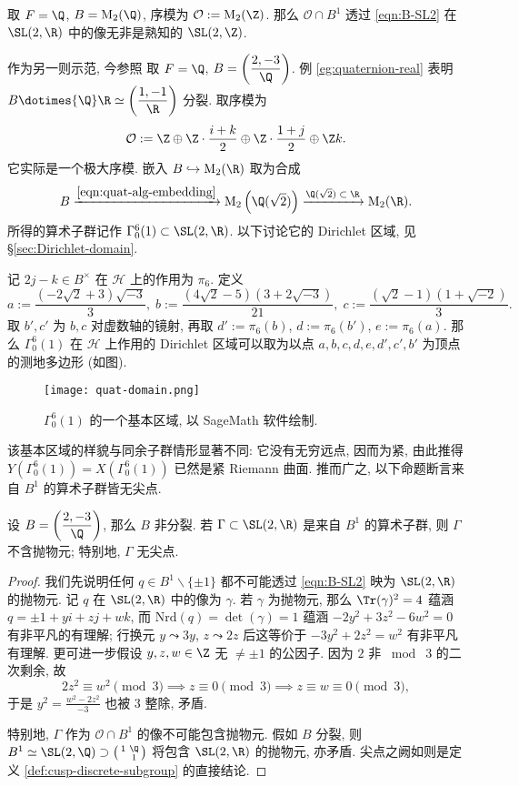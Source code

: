 \begin{example}
	取 $F = \Q$, $B = \Mat_2(\Q)$, 序模为 $\mathcal{O} := \Mat_2(\Z)$. 那么 $\mathcal{O} \cap B^1$ 透过 \eqref{eqn:B-SL2} 在 $\SL(2,\R)$ 中的像无非是熟知的 $\SL(2,\Z)$.
\end{example}

作为另一则示范, 今参照 \cite[\S 5]{KV03} 取 $F=\Q$, $B = \left( \dfrac{2, -3}{\Q} \right)$. 例 \ref{eg:quaternion-real} 表明 $B \dotimes{\Q} \R \simeq \left( \dfrac{1, -1}{\R} \right)$ 分裂. 取序模为
\[ \mathcal{O} := \Z \oplus \Z\cdot \dfrac{i + k}{2} \oplus \Z\cdot \dfrac{1 + j}{2} \oplus \Z k. \]
它实际是一个极大序模. 嵌入 $B \hookrightarrow \Mat_2(\R)$ 取为合成
\[ B \xrightarrow{\eqref{eqn:quat-alg-embedding}} \Mat_2\left(\Q(\sqrt{2})\right) \xrightarrow{\Q(\sqrt{2}) \; \subset \; \R} \Mat_2(\R). \]
所得的算术子群记作 $\Gamma^6_0(1) \subset \SL(2,\R)$. 以下讨论它的 Dirichlet 区域, 见 \S\ref{sec:Dirichlet-domain}.

记 $2j-k \in B^\times$ 在 $\mathcal{H}$ 上的作用为 $\pi_6$. 定义
\[ a := \dfrac{(-2\sqrt{2} + 3)\sqrt{-3}}{3},\; b := \dfrac{(4\sqrt{2}-5)(3 + 2\sqrt{-3})}{21},\; c := \dfrac{(\sqrt{2}-1)(1+\sqrt{-2})}{3}. \]
取 $b', c'$ 为 $b,c$ 对虚数轴的镜射, 再取 $d' := \pi_6(b)$, $d := \pi_6(b')$, $e := \pi_6(a)$. 那么 $\Gamma^6_0(1)$ 在 $\mathcal{H}$ 上作用的 Dirichlet 区域可以取为以点 $a,b,c,d,e,d',c',b'$ 为顶点的测地多边形 (如图).

\begin{figure}[h]
	\centering
	\texttt{[image: quat-domain.png]}
	\caption{$\Gamma^6_0(1)$ 的一个基本区域, 以 SageMath 软件绘制.}
\end{figure}

该基本区域的样貌与同余子群情形显著不同: 它没有无穷远点, 因而为紧, 由此推得 $Y(\Gamma^6_0(1)) = X(\Gamma^6_0(1))$ 已然是紧 Riemann 曲面. 推而广之, 以下命题断言来自 $B^1$ 的算术子群皆无尖点.

\begin{proposition}\label{prop:B-no-parabolic}
	设 $B = \left( \dfrac{2, -3}{\Q} \right)$, 那么 $B$ 非分裂. 若 $\Gamma \subset \SL(2,\R)$ 是来自 $B^1$ 的算术子群, 则 $\Gamma$ 不含抛物元; 特别地, $\Gamma$ 无尖点.
\end{proposition}
\begin{proof}
	我们先说明任何 $q \in B^1 \smallsetminus \{\pm 1\}$ 都不可能透过 \eqref{eqn:B-SL2} 映为 $\SL(2,\R)$ 的抛物元. 记 $q$ 在 $\SL(2,\R)$ 中的像为 $\gamma$. 若 $\gamma$ 为抛物元, 那么 $\Tr(\gamma)^2 = 4$ 蕴涵 $q = \pm 1 + yi + zj + wk$, 而 $\text{Nrd}(q) = \det(\gamma)=1$ 蕴涵 $-2y^2 + 3z^2 - 6w^2 = 0$ 有非平凡的有理解; 行换元 $y \leadsto 3y$, $z  \leadsto 2z$ 后这等价于 $-3y^2 + 2z^2 = w^2$ 有非平凡有理解. 更可进一步假设 $y,z,w \in \Z$ 无 $\neq \pm 1$ 的公因子. 因为 $2$ 非 $\bmod\; 3$ 的二次剩余, 故
	\[ 2z^2 \equiv w^2 \pmod 3 \implies z \equiv 0 \pmod 3 \implies z \equiv w \equiv 0 \pmod 3, \]
	于是 $y^2 = \frac{w^2 - 2z^2}{-3}$ 也被 $3$ 整除, 矛盾.
	
	特别地, $\Gamma$ 作为 $\mathcal{O} \cap B^1$ 的像不可能包含抛物元. 假如 $B$ 分裂, 则 $B^1 \simeq \SL(2,\Q) \supset \twomatrix{1}{\Q}{}{1}$ 将包含 $\SL(2,\R)$ 的抛物元, 亦矛盾. 尖点之阙如则是定义 \ref{def:cusp-discrete-subgroup} 的直接结论.
\end{proof}

